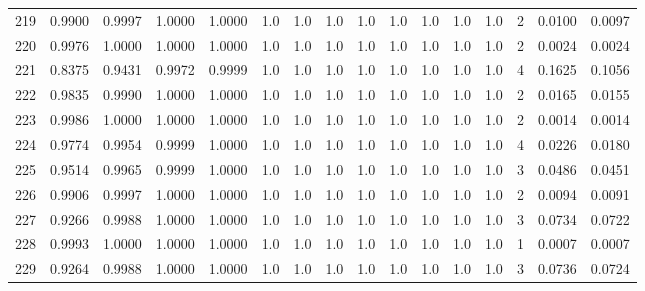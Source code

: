 \begin{tabular}{lrrrrrrrrrrrrrrr}
219 &      0.9900 &  0.9997 &  1.0000 &  1.0000 &     1.0 &     1.0 &     1.0 &     1.0 &     1.0 &     1.0 &      1.0 &        1.0 &      2 &                    0.0100 &                     0.0097 \\
220 &      0.9976 &  1.0000 &  1.0000 &  1.0000 &     1.0 &     1.0 &     1.0 &     1.0 &     1.0 &     1.0 &      1.0 &        1.0 &      2 &                    0.0024 &                     0.0024 \\
221 &      0.8375 &  0.9431 &  0.9972 &  0.9999 &     1.0 &     1.0 &     1.0 &     1.0 &     1.0 &     1.0 &      1.0 &        1.0 &      4 &                    0.1625 &                     0.1056 \\
222 &      0.9835 &  0.9990 &  1.0000 &  1.0000 &     1.0 &     1.0 &     1.0 &     1.0 &     1.0 &     1.0 &      1.0 &        1.0 &      2 &                    0.0165 &                     0.0155 \\
223 &      0.9986 &  1.0000 &  1.0000 &  1.0000 &     1.0 &     1.0 &     1.0 &     1.0 &     1.0 &     1.0 &      1.0 &        1.0 &      2 &                    0.0014 &                     0.0014 \\
224 &      0.9774 &  0.9954 &  0.9999 &  1.0000 &     1.0 &     1.0 &     1.0 &     1.0 &     1.0 &     1.0 &      1.0 &        1.0 &      4 &                    0.0226 &                     0.0180 \\
225 &      0.9514 &  0.9965 &  0.9999 &  1.0000 &     1.0 &     1.0 &     1.0 &     1.0 &     1.0 &     1.0 &      1.0 &        1.0 &      3 &                    0.0486 &                     0.0451 \\
226 &      0.9906 &  0.9997 &  1.0000 &  1.0000 &     1.0 &     1.0 &     1.0 &     1.0 &     1.0 &     1.0 &      1.0 &        1.0 &      2 &                    0.0094 &                     0.0091 \\
227 &      0.9266 &  0.9988 &  1.0000 &  1.0000 &     1.0 &     1.0 &     1.0 &     1.0 &     1.0 &     1.0 &      1.0 &        1.0 &      3 &                    0.0734 &                     0.0722 \\
228 &      0.9993 &  1.0000 &  1.0000 &  1.0000 &     1.0 &     1.0 &     1.0 &     1.0 &     1.0 &     1.0 &      1.0 &        1.0 &      1 &                    0.0007 &                     0.0007 \\
229 &      0.9264 &  0.9988 &  1.0000 &  1.0000 &     1.0 &     1.0 &     1.0 &     1.0 &     1.0 &     1.0 &      1.0 &        1.0 &      3 &                    0.0736 &                     0.0724 \\

\end{tabular}
